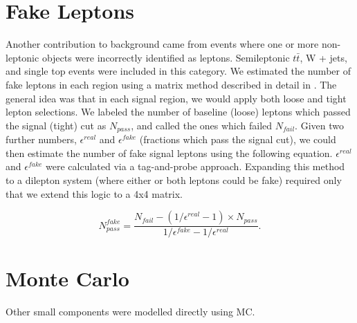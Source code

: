 \section{Fake Leptons}

Another contribution to background came from events where one or more non-leptonic objects were incorrectly identified as leptons. Semileptonic $t\bar{t}$, W + jets, and single top events were included in this category. We estimated the number of fake leptons in each region using a matrix method described in detail in \cite{fake_method}. The general idea was that in each signal region, we would apply both loose and tight lepton selections. We labeled the number of baseline (loose) leptons which passed the signal (tight) cut as $N_{pass}$, and called the ones which failed $N_{fail}$. Given two further numbers, $\epsilon^{real}$ and $\epsilon^{fake}$ (fractions which pass the signal cut), we could then estimate the number of fake signal leptons using the following equation. $\epsilon^{real}$ and $\epsilon^{fake}$ were calculated via a tag-and-probe approach. Expanding this method to a dilepton system (where either or both leptons could be fake) required only that we extend this logic to a 4x4 matrix.

\begin{equation}
N_{pass}^{fake} = \frac{N_{fail}-(1/\epsilon^{real}-1)\times N_{pass}}{1/\epsilon^{fake}-1/\epsilon^{real}}.
\end{equation}

\section{Monte Carlo}

Other small components were modelled directly using MC.